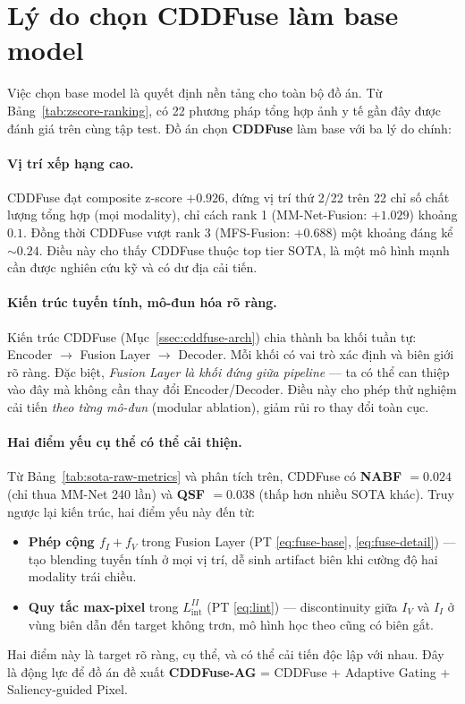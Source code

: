\section{Lý do chọn CDDFuse làm base model}
\label{sec:why-cddfuse}

Việc chọn base model là quyết định nền tảng cho toàn bộ đồ án. Từ Bảng~\ref{tab:zscore-ranking}, có 22 phương pháp tổng hợp ảnh y tế gần đây được đánh giá trên cùng tập test. Đồ án chọn \textbf{CDDFuse} \cite{zhao2023cddfuse} làm base với ba lý do chính:

\paragraph{Vị trí xếp hạng cao.}
CDDFuse đạt composite z-score $+0.926$, đứng vị trí thứ 2/22 trên 22 chỉ số chất lượng tổng hợp (mọi modality), chỉ cách rank 1 (MM-Net-Fusion: $+1.029$) khoảng $0.1$. Đồng thời CDDFuse vượt rank 3 (MFS-Fusion: $+0.688$) một khoảng đáng kể $\sim 0.24$. Điều này cho thấy CDDFuse thuộc top tier SOTA, là một mô hình mạnh cần được nghiên cứu kỹ và có dư địa cải tiến.

\paragraph{Kiến trúc tuyến tính, mô-đun hóa rõ ràng.}
Kiến trúc CDDFuse (Mục~\ref{ssec:cddfuse-arch}) chia thành ba khối tuần tự: Encoder $\to$ Fusion Layer $\to$ Decoder. Mỗi khối có vai trò xác định và biên giới rõ ràng. Đặc biệt, \emph{Fusion Layer là khối đứng giữa pipeline} --- ta có thể can thiệp vào đây mà không cần thay đổi Encoder/Decoder. Điều này cho phép thử nghiệm cải tiến \emph{theo từng mô-đun} (modular ablation), giảm rủi ro thay đổi toàn cục.

\paragraph{Hai điểm yếu cụ thể có thể cải thiện.}
Từ Bảng~\ref{tab:sota-raw-metrics} và phân tích trên, CDDFuse có \textbf{NABF $= 0.024$} (chỉ thua MM-Net 240 lần) và \textbf{QSF $= 0.038$} (thấp hơn nhiều SOTA khác). Truy ngược lại kiến trúc, hai điểm yếu này đến từ:
\begin{itemize}\itemsep0pt
    \item \textbf{Phép cộng $f_I + f_V$} trong Fusion Layer (PT \ref{eq:fuse-base}, \ref{eq:fuse-detail}) --- tạo blending tuyến tính ở mọi vị trí, dễ sinh artifact biên khi cường độ hai modality trái chiều.
    \item \textbf{Quy tắc max-pixel} trong $L_{\mathrm{int}}^{II}$ (PT \ref{eq:lint}) --- discontinuity giữa $I_V$ và $I_I$ ở vùng biên dẫn đến target không trơn, mô hình học theo cũng có biên gắt.
\end{itemize}
Hai điểm này là target rõ ràng, cụ thể, và có thể cải tiến độc lập với nhau. Đây là động lực để đồ án đề xuất \textbf{CDDFuse-AG} = CDDFuse + Adaptive Gating + Saliency-guided Pixel.

